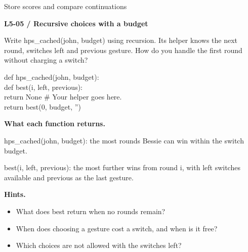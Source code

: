 \documentclass[11pt,a4paper]{article}
\begin{document}
\par\noindent\begin{minipage}{\linewidth}
{\heavy\fontsize{12}{15}\selectfont Store scores and compare continuations\par}\medskip
\textbf{L5-05 / Recursive choices with a budget}\par\smallskip Write hps\_cached(john, budget) using recursion. Its helper knows the next round, switches left and previous gesture. How do you handle the first round without charging a switch?\par
\par{}\par\smallskip\noindent\colorbox{codepaper}{\parbox{\dimexpr\linewidth-2\fboxsep\relax}{\small\ttfamily\raggedright def hps\_cached(john, budget):\\\hspace*{2.4em}def best(i, left, previous):\\\hspace*{4.8em}return None  \# Your helper goes here.\\\hspace*{2.4em}return best(0, budget, '')}}\par
{\small\textbf{What each function returns.}\par hps\_cached(john, budget): the most rounds Bessie can win within the switch budget.\par best(i, left, previous): the most further wins from round i, with left switches available and previous as the last gesture.\par }
{\small\textbf{Hints.}}\begin{itemize}\item What does best return when no rounds remain?\item When does choosing a gesture cost a switch, and when is it free?\item Which choices are not allowed with the switches left?\end{itemize}
\end{minipage}\par\vspace{4mm}
\end{document}
